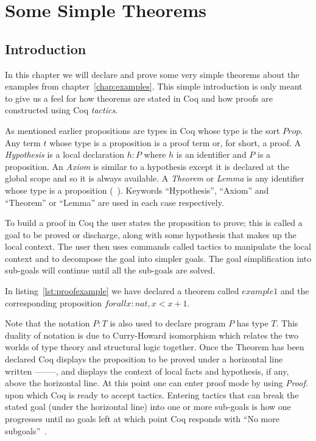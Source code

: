 \chapter{Some Simple Theorems}

\section{Introduction}

In this chapter we will declare and prove some very simple theorems about the examples from chapter~\ref{chap:examples}. This simple introduction is only meant to give us a feel for how theorems are stated in Coq and how proofs are constructed using Coq \emph{tactics}. 

As mentioned earlier propositions are types in Coq whose type is the sort $Prop$. Any term $t$ whose type is a proposition is a proof term or, for short, a proof. A \emph{Hypothesis} is a local declaration $h : P$ where $h$ is an identifier and $P$ is a proposition. An \emph{Axiom} is similar to a hypothesis except it is declared at the global scope and so it is always available. A \emph{Theorem} or \emph{Lemma} is any identifier whose type is a proposition (~\cite{BC04}). Keywords ``Hypothesis'', ``Axiom'' and ``Theorem'' or ``Lemma'' are used in each case respectively. 

To build a proof in Coq the user states the proposition to prove; this is called a goal to be proved or discharge, along with some hypothesis that makes up the local context. The user then uses commands called tactics to manipulate the local context and to decompose the goal into simpler goals. The goal simplification into sub-goals will continue until all the sub-goals are solved.

In listing~\ref{lst:proofexample} we have declared a theorem called $example1$ and the corresponding proposition $forall x:nat, x < x + 1.$
 
Note that the notation $P : T$ is also used to declare program $P$ has type $T$. This duality of notation is due to Curry-Howard isomorphism which relates the two worlds of type theory and structural logic together. Once the Theorem has been declared Coq displays the proposition to be proved under a horizontal line written --------, and displays the context of local facts and hypothesis, if any, above the horizontal line. At this point one can enter proof mode by using \emph{Proof.} upon which Coq is ready to accept tactics. Entering tactics that can break the stated goal (under the horizontal line) into one or more sub-goals is how one progresses until no goals left at which point Coq responds with ``No more subgoals''~\cite{CoqHurry}.

